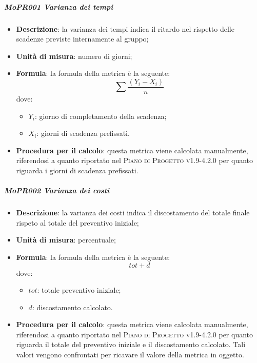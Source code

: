 \subparagraph{MoPR001 Varianza dei tempi}
\begin{itemize}
  \item \textbf{Descrizione}: la varianza dei tempi indica il ritardo nel rispetto delle scadenze previste internamente al gruppo;
  \item \textbf{Unità di misura}: numero di giorni;
  \item \textbf{Formula}: la formula della metrica è la seguente:
    \begin{displaymath}
    \sum \frac{(Y_i - X_i)}{n}
    \end{displaymath}
    dove:
    \begin{itemize}
      \item $ Y_i $: giorno di completamento della scadenza;
      \item $ X_i $: giorni di scadenza prefissati.
    \end{itemize}
    \item \textbf{Procedura per il calcolo}: questa metrica viene calcolata manualmente, riferendosi a quanto riportato nel \textsc{Piano di Progetto v1.9-4.2.0} per quanto riguarda i giorni di scadenza prefissati.
\end{itemize}

\subparagraph{MoPR002 Varianza dei costi}
\begin{itemize}
  \item \textbf{Descrizione}: la varianza dei costi indica il discostamento del totale finale rispeto al totale del preventivo iniziale;
  \item \textbf{Unità di misura}: percentuale;
  \item \textbf{Formula}: la formula della metrica è la seguente:
  \begin{displaymath}
    tot + d
  \end{displaymath}
  dove:
  \begin{itemize}
    \item $ tot $: totale preventivo iniziale;
    \item $ d $: discostamento calcolato.
  \end{itemize}
  \item \textbf{Procedura per il calcolo}: questa metrica viene calcolata manualmente, riferendosi a quanto riportato nel \textsc{Piano di Progetto v1.9-4.2.0} per quanto riguarda il totale del preventivo iniziale e il discostamento calcolato. Tali valori vengono confrontati per ricavare il valore della metrica in oggetto.
\end{itemize}

